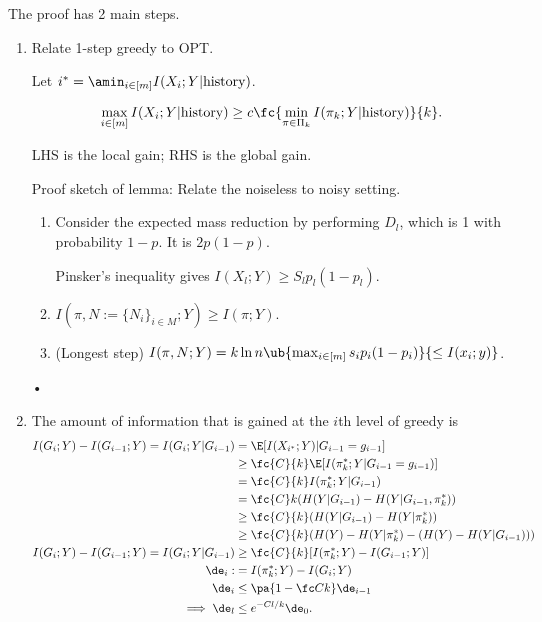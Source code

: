 The proof has 2 main steps.
\begin{enumerate}
\item
Relate 1-step greedy to OPT. 

Let $i^*=\amin_{i\in [m]} I(X_i; Y|\text{history})$. 

\begin{lem}
$$
\max_{i\in [m]}I(X_i;Y|\text{history}) \ge c\fc{\min_{\pi\in \Pi_k} I(\pi_k;Y|\text{history})}{k}.$$
\end{lem}
LHS is the local gain; RHS is the global gain.

Proof sketch of lemma: Relate the noiseless to noisy setting.
\begin{enumerate}
\item
Consider the expected mass reduction by performing $D_l$, which is 1 with probability $1-p$. It is $2p(1-p)$.

Pinsker's inequality gives $I(X_l;Y)\ge S_l p_l(1-p_l)$. 
\item
$I(\pi, N:= \{N_i\}_{i\in M};Y) \ge I(\pi;Y)$.
\item
(Longest step) $I(\pi,N;Y) = k\ln n \ub{\max_{i\in [m]} s_i p_i (1-p_i)}{\le I(x_i;y)}$.
\end{enumerate}•
\item

The amount of information that is gained at the $i$th level of greedy is 
\begin{align}
I(G_i;Y) - I(G_{i-1};Y) = I(G_i;Y | G_{i-1}) &= \E[I(X_{i^*};Y)|G_{i-1}=g_{i-1}]\\
&\ge \fc{C}{k} \E[I(\pi_k^*;Y|G_{i-1}=g_{i-1})]\\
&=\fc{C}{k} I(\pi_k^*; Y|G_{i-1}) \\
&= \fc{C}k (H(Y|G_{i-1}) - H(Y|G_{i-1}, \pi_k^*))\\
&\ge \fc{C}{k} (H(Y|G_{i-1}) - H(Y|\pi_k^*))\\
&\ge \fc{C}{k} (H(Y) - H(Y|\pi_k^*) - (H(Y)-H(Y|G_{i-1})))\\
I(G_i;Y) - I(G_{i-1};Y) = I(G_i;Y | G_{i-1}) &\ge \fc{C}{k} [I(\pi_k^*;Y)-I(G_{i-1};Y)]\\
\de_i:&=I(\pi_k^*; Y)-I(G_i;Y)\\
\de_i &\le \pa{1-\fc Ck} \de_{i-1} \\
\implies \de_l &\le e^{-Cl/k} \de_0.
\end{align}
\end{enumerate}


